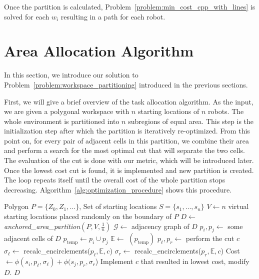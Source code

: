 \documentclass[../main.tex]{subfiles}
\begin{document}
Once the partition is calculated, Problem~\ref{problem:min_cost_cpp_with_lines} is solved for each $w_i$ resulting in a path for each robot.


\section{Area Allocation Algorithm}
\label{sec:area_allocation_algo}
In this section, we introduce our solution to Problem~\ref{problem:workspace_partitioning} introduced in the previous sections.

First, we will give a brief overview of the task allocation algorithm. As the input, we are given a polygonal workspace with $n$ starting locations of $n$ robots. The whole environment is partitioned into $n$ subregions of equal area. This step is the initialization step after which the partition is iteratively re-optimized. From this point on, for every pair of adjacent cells in this partition, we combine their area and perform a search for the most optimal cut that will separate the two cells. The evaluation of the cut is done with our metric, which will be introduced later. Once the lowest cost cut is found, it is implemented and new partition is created. The loop repeats itself until the overall cost of the whole partition stops decreasing. Algorithm~\ref{alg:optimization_procedure} shows this procedure.

\begin{algorithm}
	\small
	\caption{$\operatorname{optimization\_procedure}(P, S)$}
	\label{alg:optimization_procedure}
	\begin{algorithmic}[1]
		\REQUIRE Polygon $P=\{Z_0,Z_1,\ldots\}$, Set of starting locations $S=\{s_1,\ldots,s_n\}$
			\STATE $V\gets n$ virtual starting locations placed randomly on the boundary of $P$ \label{line:1_start_locs}
			\STATE $D\gets$ \textit{anchored\_area\_partition}$(P,V,\frac{1}{n})$
			\STATE $\mathcal{G}\gets$ adjacency graph of $D$
			\REPEAT
				\STATE $p_i,p_j\gets$ some adjacent cells of $D$
				\STATE $p_{\operatorname{temp}}\gets p_i\cup p_j$
				\STATE $\mathbb{E}\gets$ $(p_{\operatorname{temp}})$ \label{line:compute_encirlment}
					\STATE $p_{\ell},p_r\gets$ perform the cut $c$
					\STATE $\sigma_{\ell}\gets$ recalc\_encirclements($p_{\ell},\mathbb{E}, c$) \label{line:recalc_encirclemnts_1}
					\STATE $\sigma_r\gets$ recalc\_encirclements($p_r, \mathbb{E}, c$) \label{line:recalc_encirclemnts_2}
					\STATE Cost $\gets\phi(s_i,p_{\ell},\sigma_{\ell})+\phi(s_j,p_r,\sigma_r$) 
				\ENDFOR
				\STATE Implement $c$ that resulted in lowest cost, modify $D$.
			\RETURN $D$
	\end{algorithmic}
\end{algorithm}
\end{document}
